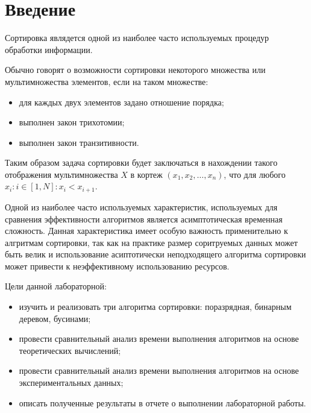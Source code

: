 \chapter*{Введение}

Сортировка являдется одной из наиболее часто используемых процедур обработки
информации.

Обычно говорят о возможности сортировки некоторого множества или мультимножества
элементов, если на таком множестве:
\begin{itemize}
    \item для каждых двух элементов задано отношение порядка;
    \item выполнен закон трихотомии;
    \item выполнен закон транзитивности.
\end{itemize}

Таким образом задача сортировки будет заключаться в нахождении такого отображения
мультимножества $X$ в кортеж $(x_1, x_2, \dots, x_n)$,
что для любого $x_i : i \in [1, N] : x_i < x_{i+1}$.


Одной из наиболее часто используемых характеристик, используемых для сравнения
эффективности алгоритмов является асимптотическая временная сложность. Данная
характеристика имеет особую важность применительно к алгритмам сортировки, так
как на практике размер соритруемых данных может быть велик и
использование асиптотически неподходящего алгоритма сортировки может привести к
неэффективному использованию ресурсов.


Цели данной лабораторной:

\begin{itemize}
    \item изучить и реализовать три алгоритма сортировки: поразрядная, бинарным деревом, бусинами;
    \item провести сравнительный анализ времени выполнения алгоритмов на основе теоретических вычислений;
    \item провести сравнительный анализ времени выполнения алгоритмов на основе экспериментальных данных;
    \item описать полученные результаты в отчете о выполнении лабораторной работы.
\end{itemize}
